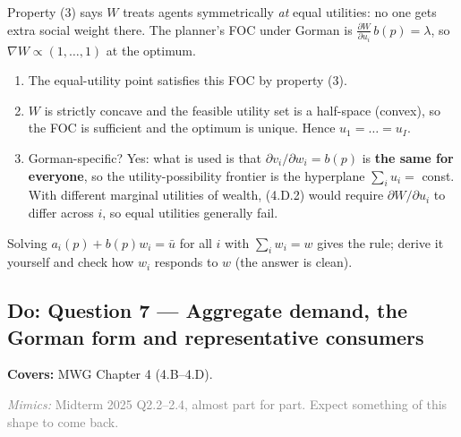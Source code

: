 \documentclass[11pt]{article}
\newcommand{\covers}[1]{\par\noindent\textcolor{blue!60!black}{\small\textbf{Covers:} #1}\medskip}
\newcommand{\mimic}[1]{\par\noindent\textcolor{gray}{\small\textit{Mimics:} #1}\medskip}
\begin{document}
\begin{exam}
Property (3) says $W$ treats agents symmetrically \emph{at} equal utilities: no one gets extra social weight there.
The planner's FOC under Gorman is $\frac{\partial W}{\partial u_i}\,b(p)=\lambda$, so $\nabla W\propto(1,\dots,1)$ at the optimum.
\begin{enumerate}
\item The equal-utility point satisfies this FOC by property (3).
\item $W$ is strictly concave and the feasible utility set is a half-space (convex), so the FOC is sufficient and the optimum is unique. Hence $u_1=\dots=u_I$.
\item Gorman-specific? Yes: what is used is that $\partial v_i/\partial w_i=b(p)$ is \textbf{the same for everyone}, so the utility-possibility frontier is the hyperplane $\sum_iu_i=$ const. With different marginal utilities of wealth, (4.D.2) would require $\partial W/\partial u_i$ to differ across $i$, so equal utilities generally fail.
\end{enumerate}
Solving $a_i(p)+b(p)w_i=\bar u$ for all $i$ with $\sum_iw_i=w$ gives the rule; derive it yourself and check how $w_i$ responds to $w$ (the answer is clean).
\end{exam}

\subsection{Do: Question 7 --- Aggregate demand, the Gorman form and representative consumers}
\covers{MWG Chapter 4 (4.B--4.D).}
\mimic{Midterm 2025 Q2.2--2.4, almost part for part. Expect something of this shape to come back.}
\end{document}
